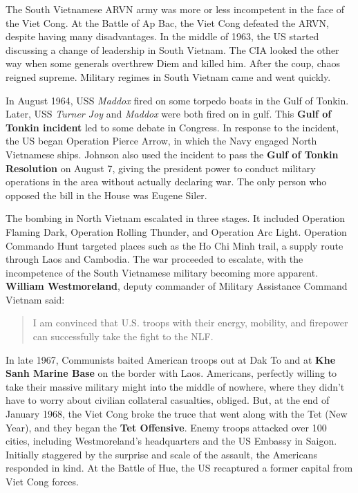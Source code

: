 The South Vietnamese ARVN army was more or less incompetent in the face of the Viet Cong.
At the Battle of Ap Bac, the Viet Cong defeated the ARVN, despite having many disadvantages.
In the middle of 1963, the US started discussing a change of leadership in South Vietnam.
The CIA looked the other way when some generals overthrew Diem and killed him.
After the coup, chaos reigned supreme.
Military regimes in South Vietnam came and went quickly.

In August 1964, USS \textit{Maddox} fired on some torpedo boats in the Gulf of Tonkin.
Later, USS \textit{Turner Joy} and \textit{Maddox} were both fired on in gulf.
This \textbf{Gulf of Tonkin incident} led to some debate in Congress.
In response to the incident, the US began Operation Pierce Arrow, in which the Navy engaged North Vietnamese ships.
Johnson also used the incident to pass the \textbf{Gulf of Tonkin Resolution} on August 7,
giving the president power to conduct military operations in the area without actually declaring war.
The only person who opposed the bill in the House was Eugene Siler.

The bombing in North Vietnam escalated in three stages.
It included Operation Flaming Dark, Operation Rolling Thunder, and Operation Arc Light.
Operation Commando Hunt targeted places such as the Ho Chi Minh trail, a supply route through Laos and Cambodia.
The war proceeded to escalate, with the incompetence of the South Vietnamese military becoming more apparent.
\textbf{William Westmoreland}, deputy commander of Military Assistance Command Vietnam said:
\begin{quote}
  I am convinced that U.S. troops
  with their energy, mobility, and firepower can successfully take the fight to the NLF\@.
\end{quote}

In late 1967, Communists baited American troops out at Dak To
and at \textbf{Khe Sanh Marine Base} on the border with Laos.
Americans, perfectly willing to take their massive military might into the middle of nowhere,
where they didn't have to worry about civilian collateral casualties, obliged.
But, at the end of January 1968, the Viet Cong broke the truce that went along with the Tet (New Year),
and they began the \textbf{Tet Offensive}.
Enemy troops attacked over 100 cities, including Westmoreland's headquarters and the US Embassy in Saigon.
Initially staggered by the surprise and scale of the assault, the Americans responded in kind.
At the Battle of Hue, the US recaptured a former capital from Viet Cong forces.

